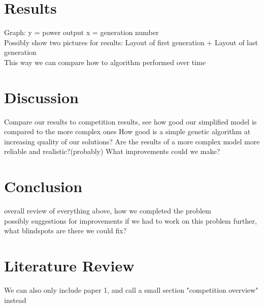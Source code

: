 \documentclass{article}
\begin{document}
\section{Results}

Graph: y = power output  x = generation number
\newline
\\
Possibly show two pictures for results:	Layout of first generation + Layout of last generation
\\
This way we can compare how to algorithm performed over time




\section{Discussion}
Compare our results to competition results, see how good our simplified model is compared to the more complex ones
\newline
How good is a simple genetic algorithm at increasing quality of our solutions? 
\newline
Are the results of a more complex model more reliable and realistic?(probably)
\newline
What improvements could we make?
\newline



\section{Conclusion}

overall review of everything above, how we completed the problem
\\
\newline
possibly suggestions for improvements if we had to work on this problem further, what blindspots are there we could fix?

\section{Literature Review}
We can also only include paper 1, and call a small section "competition overview" instead
\end{document}
